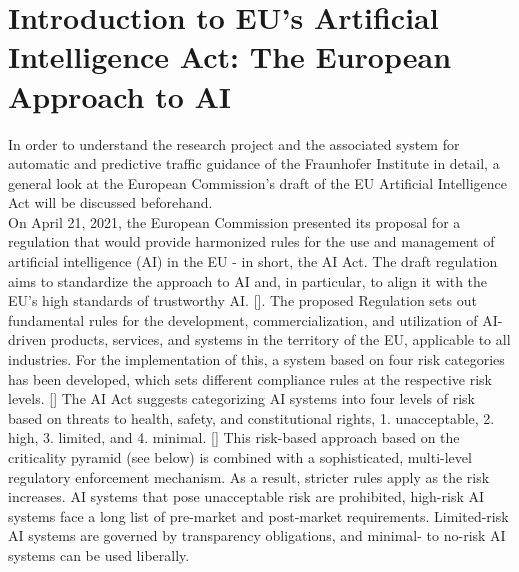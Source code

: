 \section{Introduction to EU's Artificial Intelligence Act: The European Approach to AI}
    In order to understand the research project and the associated system for automatic and predictive traffic guidance of the Fraunhofer Institute in detail, a general look at the European Commission's draft of the EU Artificial Intelligence Act will be discussed beforehand.\\
    On April 21, 2021, the European Commission presented its proposal for a regulation that would provide harmonized rules for the use and management of artificial intelligence (AI) in the EU - in short, the AI Act. The draft regulation aims to standardize the approach to AI and, in particular, to align it with the EU's high standards of trustworthy AI. [\citet{kop2021eu}]. The proposed Regulation sets out fundamental rules for the development, commercialization, and utilization of AI-driven products, services, and systems in the territory of the EU, applicable to all industries. For the implementation of this, a system based on four risk categories has been developed, which sets different compliance rules at the respective risk levels. [\citet{ebers2021standardizing}] The AI Act suggests categorizing AI systems into four levels of risk based on threats to health, safety, and constitutional rights, 1. unacceptable, 2. high, 3. limited, and 4. minimal.  [\citet{lutge2022risk}] This risk-based approach based on the criticality pyramid (see below) is combined with a sophisticated, multi-level regulatory enforcement mechanism. As a result, stricter rules apply as the risk increases. AI systems that pose unacceptable risk are prohibited, high-risk AI systems face a long list of pre-market and post-market requirements. Limited-risk AI systems are governed by transparency obligations, and minimal- to no-risk AI systems can be used liberally.\\

